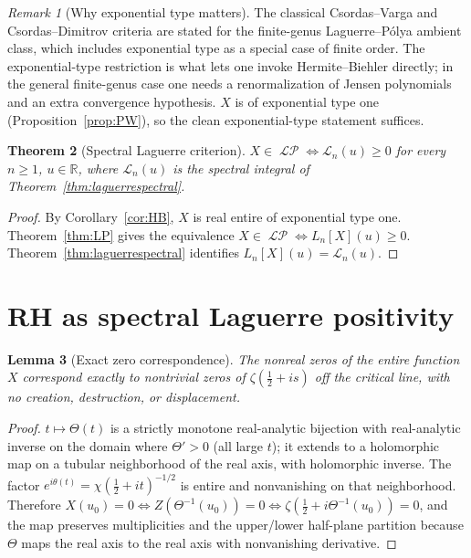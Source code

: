 \documentclass[11pt,reqno]{amsart}
\theoremstyle{plain}
\newtheorem{theorem}{Theorem}[section]
\newtheorem{lemma}[theorem]{Lemma}
\theoremstyle{definition}
\theoremstyle{remark}
\newtheorem{remark}[theorem]{Remark}
\DeclareMathOperator{\LP}{\mathcal{LP}}
\newcommand{\Lc}{\mathcal L}
\newcommand{\R}{\mathbb R}
\begin{document}
\begin{remark}[Why exponential type matters]
The classical Csordas--Varga and Csordas--Dimitrov criteria are stated for
the finite-genus Laguerre--P\'olya ambient class, which includes
exponential type as a special case of finite order. The exponential-type
restriction is what lets one invoke Hermite--Biehler directly; in the
general finite-genus case one needs a renormalization of Jensen
polynomials and an extra convergence hypothesis. \(X\) is of
exponential type one (Proposition~\ref{prop:PW}), so the clean
exponential-type statement suffices.
\end{remark}

\begin{theorem}[Spectral Laguerre criterion]\label{thm:spectralcriterion}
\(X\in\LP\iff \Lc_n(u)\ge0\) for every \(n\ge1\), \(u\in\R\), where
\(\Lc_n(u)\) is the spectral integral of
Theorem~\ref{thm:laguerrespectral}.
\end{theorem}

\begin{proof}
By Corollary~\ref{cor:HB}, \(X\) is real entire of exponential type one.
Theorem~\ref{thm:LP} gives the equivalence \(X\in\LP\iff L_n[X](u)\ge0\).
Theorem~\ref{thm:laguerrespectral} identifies \(L_n[X](u)=\Lc_n(u)\).
\end{proof}

\section{RH as spectral Laguerre positivity}

\begin{lemma}[Exact zero correspondence]\label{lem:zero}
The nonreal zeros of the entire function \(X\) correspond exactly to
nontrivial zeros of \(\zeta(\tfrac12+is)\) off the critical line, with no
creation, destruction, or displacement.
\end{lemma}

\begin{proof}
\(t\mapsto\Theta(t)\) is a strictly monotone real-analytic bijection with
real-analytic inverse on the domain where \(\Theta'>0\) (all large \(t\));
it extends to a holomorphic map on a tubular neighborhood of the real
axis, with holomorphic inverse. The factor
\(e^{i\theta(t)}=\chi(\tfrac12+it)^{-1/2}\) is entire and nonvanishing on
that neighborhood. Therefore \(X(u_0)=0\iff
Z(\Theta^{-1}(u_0))=0\iff\zeta(\tfrac12+i\Theta^{-1}(u_0))=0\), and the
map preserves multiplicities and the upper/lower half-plane partition
because \(\Theta\) maps the real axis to the real axis with nonvanishing
derivative.
\end{proof}
\end{document}
